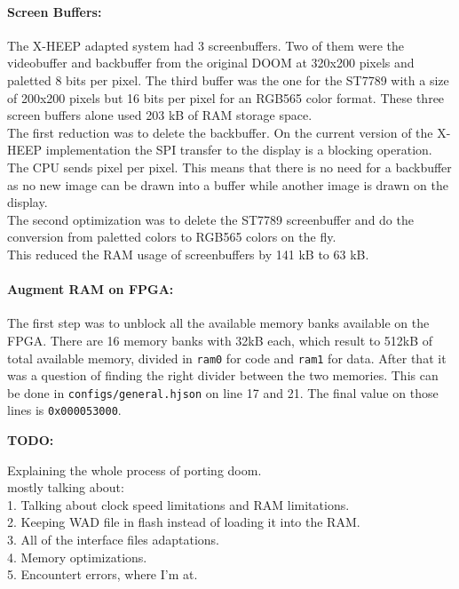 \paragraph{Screen Buffers:} The X-HEEP adapted system had 3 screenbuffers. Two of them were the videobuffer and backbuffer from the original DOOM at 320x200 pixels and paletted 8 bits per pixel. The third buffer was the one for the ST7789 with a size of 200x200 pixels but 16 bits per pixel for an RGB565 color format. These three screen buffers alone used 203 kB of RAM storage space. \\
The first reduction was to delete the backbuffer. On the current version of the X-HEEP implementation the SPI transfer to the display is a blocking operation. The CPU sends pixel per pixel. This means that there is no need for a backbuffer as no new image can be drawn into a buffer while another image is drawn on the display. \\
The second optimization was to delete the ST7789 screenbuffer and do the conversion from paletted colors to RGB565 colors on the fly. \\
This reduced the RAM usage of screenbuffers by 141 kB to 63 kB.


\paragraph{Augment RAM on FPGA:} The first step was to unblock all the available memory banks available on the FPGA. There are 16 memory banks with 32kB each, which result to 512kB of total available memory, divided in \texttt{ram0} for code and \texttt{ram1} for data. After that it was a question of finding the right divider between the two memories. This can be done in \texttt{configs/general.hjson} on line 17 and 21. The final value on those lines is \texttt{0x000053000}.






\textbf{TODO:} 

Explaining the whole process of porting doom. \\

mostly talking about:\\

1. Talking about clock speed limitations and RAM limitations. \\
2. Keeping WAD file in flash instead of loading it into the RAM. \\
3. All of the interface files adaptations. \\
4. Memory optimizations. \\
5. Encountert errors, where I'm at. \\

